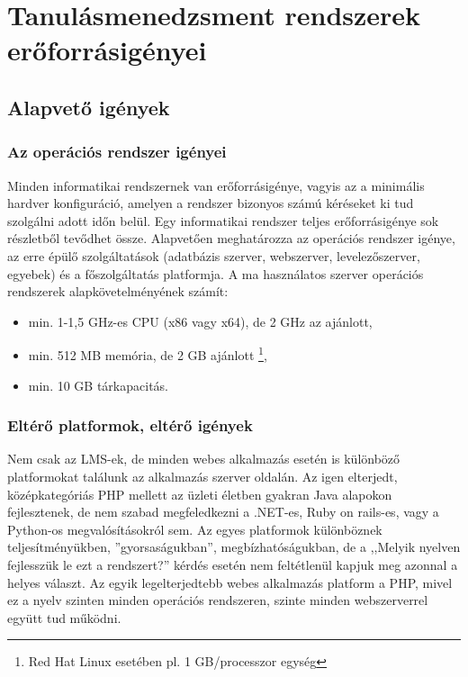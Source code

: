 \chapter{Tanulásmenedzsment rendszerek erőforrásigényei}
\section{Alapvető igények}
\subsection{Az operációs rendszer igényei}
Minden informatikai rendszernek van erőforrásigénye, vagyis az a minimális hardver konfiguráció, amelyen a rendszer bizonyos számú kéréseket ki tud szolgálni adott időn belül. 
Egy informatikai rendszer teljes erőforrásigénye sok részletből tevődhet össze. Alapvetően meghatározza az operációs rendszer igénye, az erre épülő szolgáltatások (adatbázis szerver, webszerver, levelezőszerver, egyebek) és a főszolgáltatás platformja.
A ma használatos szerver operációs rendszerek alapkövetelményének számít:


\begin{itemize}
\item min. 1-1,5 GHz-es CPU (x86 vagy x64), de 2 GHz az ajánlott,
\item min. 512 MB memória, de 2 GB ajánlott \footnote{Red Hat Linux esetében pl. 1 GB/processzor egység},
\item min. 10 GB tárkapacitás.
\end{itemize}

\subsection{Eltérő platformok, eltérő igények}
Nem csak az LMS-ek, de minden webes alkalmazás esetén is különböző platformokat találunk az alkalmazás szerver oldalán. Az igen elterjedt, középkategóriás PHP mellett az üzleti életben gyakran Java alapokon fejlesztenek, de nem szabad megfeledkezni a .NET-es, Ruby on rails-es, vagy a Python-os megvalósításokról sem.
Az egyes platformok különböznek teljesítményükben, ''gyorsaságukban'', megbízhatóságukban, de a ,,Melyik nyelven fejlesszük le ezt a rendszert?'' kérdés esetén nem feltétlenül kapjuk meg azonnal a helyes választ.
Az egyik legelterjedtebb webes alkalmazás platform a PHP, mivel ez a nyelv szinten minden operációs rendszeren, szinte minden webszerverrel együtt tud működni.

